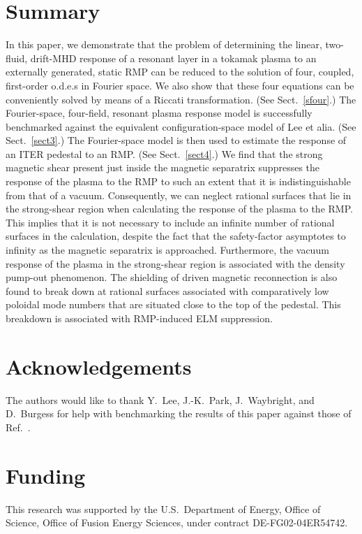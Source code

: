 \documentclass[12pt,prb,aps]{revtex4-1}
\begin{document}
\section{Summary}\label{sect5}
In this paper, we  demonstrate that the problem of determining  the linear, two-fluid, drift-MHD response of a resonant layer in a tokamak plasma to an externally generated, static  RMP can  be reduced to
the solution of  four, coupled, first-order o.d.e.s in Fourier space. 
We also show that these 
four equations  can be conveniently solved by means of a Riccati transformation. (See Sect.~\ref{sfour}.) The Fourier-space, four-field, resonant plasma response model is successfully benchmarked against the equivalent configuration-space model of Lee et alia.\cite{lee} (See Sect.~\ref{sect3}.) The Fourier-space model is then used to
estimate the response of an ITER pedestal to an RMP. (See Sect.~\ref{sect4}.) We find that the strong magnetic shear present just inside the magnetic
separatrix  suppresses the response of the plasma to the RMP to such an extent that it is indistinguishable from that
of a vacuum.\cite{rf2025} Consequently, we can neglect rational surfaces that lie in the strong-shear region when calculating the response of the plasma to the RMP. This implies
that it is not necessary to include an infinite number of rational surfaces in the calculation, despite the fact that the safety-factor asymptotes to infinity
as the magnetic separatrix is approached.  Furthermore, the vacuum response of the plasma in the strong-shear region is associated with the density pump-out phenomenon. The shielding of driven magnetic reconnection is also found to break down at rational surfaces associated with comparatively low
poloidal mode numbers that are situated close to the top of the pedestal. This breakdown is associated with RMP-induced ELM suppression.  

\section*{Acknowledgements}
The authors would like to thank   Y.~Lee, J.-K.~Park, J.~Waybright, and D.~Burgess for help with benchmarking the results of this paper against those of
Ref.~. 

\section*{Funding}
This research was supported by the U.S.\ Department of Energy, Office of Science, Office of Fusion Energy Sciences,  under  contract DE-FG02-04ER54742. 
\end{document}
